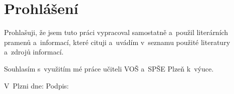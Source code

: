 \section*{Prohlášení}
\noindent
Prohlašuji, že jsem tuto práci vypracoval samostatně a~použil literárních
pramenů a~informací, které cituji a~uvádím v~seznamu použité literatury
a~zdrojů informací.

\noindent
Souhlasím s~využitím mé práce učiteli VOŠ a~SPŠE Plzeň k~výuce.

\bigskip
{%
    \raggedright
    \hfill V~Plzni dne: \dotfill \hspace*{1em}Podpis: \dotfill
}
